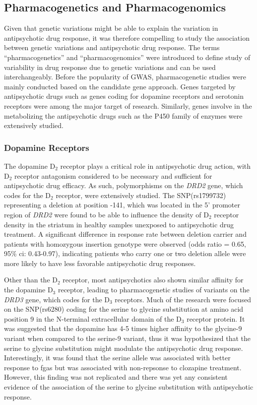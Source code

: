	\subsection{Pharmacogenetics and Pharmacogenomics}
	Given that genetic variations might be able to explain the variation in antipsychotic drug response, it was therefore compelling to study the association between genetic variations and antipsychotic drug response.
	The terms ``pharmacogenetics'' and ``pharmacogenomics'' were introduced to define study of variability in drug response due to genetic variations and can be used interchangeably\citep{Pirmohamed2001}. 
	Before the popularity of \gls{GWAS}, pharmacogenetic studies were mainly conducted based on the candidate gene approach.
	Genes targeted by antipsychotic drugs such as genes coding for dopamine receptors and serotonin receptors were among the major target of research.
	Similarly, genes involve in the metabolizing the antipsychotic drugs such as the P450 family of enzymes were extensively studied.
	\subsubsection{Dopamine Receptors}
	The dopamine D$_2$ receptor plays a critical role in antipsychotic drug action, with D$_2$ receptor antagonism considered to be necessary and sufficient for antipsychotic drug efficacy\citep{Kapur2003}.
	As such, polymorphisms on the \textit{DRD2} gene, which codes for the D$_2$ receptor, were extensively studied. 
	The \gls{SNP}(rs1799732) representing a deletion at position -141, which was located in the 5' promoter region of \textit{DRD2} were found to be able to influence the density of D$_2$ receptor density in the striatum in healthy samples unexposed to antipsychotic drug treatment\citep{Arinami1997}.
	A significant difference in response rate between deletion carrier and patients with homozygous insertion genotype were observed (odds ratio = 0.65, 95\% \gls{ci}: 0.43-0.97), indicating patients who carry one or two deletion allele were more likely to have less favorable antipsychotic drug responses.

	Other than the D$_2$ receptor, most antipsychotics also shown similar affinity for the dopamine D$_3$ receptor\citep{Sokoloff2006}, leading to pharmacogenetic studies of variants on the \textit{DRD3} gene, which codes for the D$_3$ receptors.
	Much of the research were focused on the \gls{SNP}(rs6280) coding for the serine to glycine substitution at amino acid position 9 in the N-terminal extracellular domain of the D$_3$ receptor protein.
	It was suggested that the dopamine has 4-5 times higher affinity to the glycine-9 variant when compared to the serine-9 variant\citep{Jeanneteau2006}, thus it was hypothesized that the serine to glycine substitution might modulate the antipsychotic drug response. 
	Interestingly, it was found that the serine allele was associated with better response to \glspl{fga} but was associated with non-repsonse to clozapine treatment\citep{Zhang2011}. 
	However, this finding was not replicated and there was yet any consistent evidence of the association of the serine to glycine substitution with antipsychotic response\citep{Zhang2011}.
	
